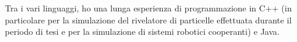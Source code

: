 \documentclass[a4paper,12pt]{article} %
\begin{document}
Tra i vari linguaggi, ho una lunga esperienza di programmazione in C++ (in particolare per la simulazione del rivelatore di particelle effettuata durante il periodo di tesi e per la simulazione di sistemi robotici cooperanti) e Java.\\


\Sep %















\Sep %

%
%
\end{document}
